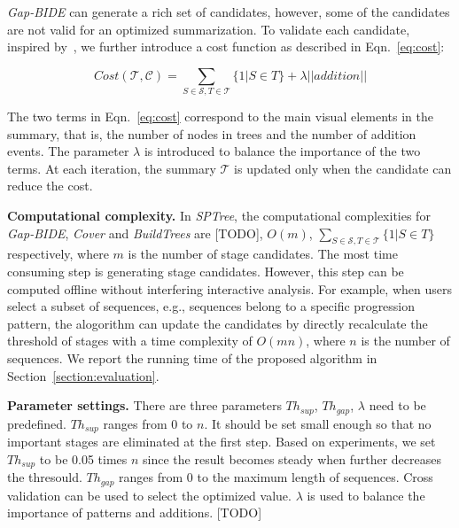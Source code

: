 \textit{Gap-BIDE} can generate a rich set of candidates, however, some of the candidates are not valid for an optimized summarization. To validate each candidate, inspired by~\cite{chen2018sequence}, we further introduce a cost function as described in Eqn.~\ref{eq:cost}:

\begin{equation}
Cost(\mathscr{T},\mathscr{C}) = \sum_{S \in \mathscr{S}, T \in \mathscr{T}}\{1| S \in T\} + \lambda||addition||
\label{eq:cost}
\end{equation}

The two terms in Eqn.~\ref{eq:cost} correspond to the main visual elements in the summary, that is, the number of nodes in trees and the number of addition events. The parameter $\lambda$ is introduced to balance the importance of the two terms. At each iteration, the summary $\mathscr{T}$ is updated only when the candidate can reduce the cost.  

\textbf{Computational complexity.} In \textit{SPTree}, the computational complexities for \textit{Gap-BIDE}, \textit{Cover} and \textit{BuildTrees} are [TODO], $O(m)$, $\sum_{S \in \mathscr{S}, T \in \mathscr{T}}\{1| S \in T\}$ respectively, where $m$ is the number of stage candidates. The most time consuming step is generating stage candidates. However, this step can be computed offline without interfering interactive analysis. For example, when users select a subset of sequences, e.g., sequences belong to a specific progression pattern, the alogorithm can update the candidates by directly recalculate the threshold of stages with a time complexity of $O(mn)$, where $n$ is the number of sequences. We report the running time of the proposed algorithm in Section~\ref{section:evaluation}.

\textbf{Parameter settings.} There are three parameters $Th_{sup}$, $Th_{gap}$, $\lambda$ need to be predefined. $Th_{sup}$ ranges from 0 to $n$. It should be set small enough so that no important stages are eliminated at the first step. Based on experiments, we set $Th_{sup}$ to be 0.05 times $n$ since the result becomes steady when further decreases the thresould. $Th_{gap}$ ranges from 0 to the maximum length of sequences. Cross validation can be used to select the optimized value. $\lambda$ is used to balance the importance of patterns and additions. [TODO] 


